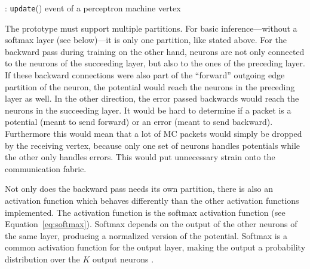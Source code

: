 \documentclass[]{article}
\begin{document}
\begin{algorithm} %
  \caption{: \texttt{update}() event of a perceptron machine vertex}
  \label{alg:update}

  \begin{algorithmic}[1]
      \ENDFOR
    \ENDIF
  \end{algorithmic}
\end{algorithm} %

The prototype must support multiple partitions.
For basic inference---without a softmax layer (see below)---it is only
one partition, like stated above.
For the backward pass during training on the other hand, neurons are
not only connected to the neurons of the succeeding layer, but also
to the ones of the preceding layer.
If these backward connections were also part of the ``forward''
outgoing edge partition of the neuron, the potential would reach the
neurons in the preceding layer as well.
In the other direction, the error passed backwards would reach the
neurons in the succeeding layer.
It would be hard to determine if a packet is a potential (meant to
send forward) or an error (meant to send backward).
Furthermore this would mean that a lot of MC packets would simply
be dropped by the receiving vertex, because only one set of neurons
handles potentials while the other only handles errors.
This would put unnecessary strain onto the communication fabric.

Not only does the backward pass needs its own partition, there is
also an activation function which behaves differently than the other
activation functions implemented.
The activation function is the softmax activation function
(see Equation~\ref{eq:softmax}).
Softmax depends on the output of the other neurons of the same layer,
producing a normalized version of the potential.
Softmax is a common activation function for the output layer, making
the output a probability distribution over the $K$ output neurons
\citep{goodfellow_et_al_2016}.
\end{document}
